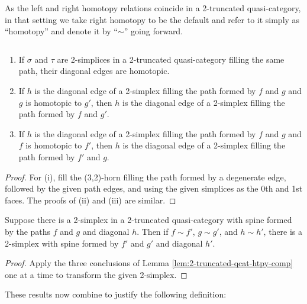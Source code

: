 As the left and right homotopy relations coincide in a 2-truncated quasi-category, in that setting we take right homotopy to be the default and refer to it simply as ``homotopy'' and denote it by ``$\sim$'' going forward.

\begin{lemma}\label{lem:2-truncated-qcat-htpy-comp}
   $\quad$
  \begin{enumerate}
    \item If $\sigma$ and $\tau$ are 2-simplices in a 2-truncated quasi-category filling the same path, their diagonal edges are homotopic.
    \item If $h$ is the diagonal edge of a 2-simplex filling the path formed by $f$ and $g$ and $g$ is homotopic to $g'$, then $h$ is the diagonal edge of a 2-simplex filling the path formed by $f$ and $g'$.
    \item If $h$ is the diagonal edge of a 2-simplex filling the path formed by $f$ and $g$ and $f$ is homotopic to $f'$, then $h$ is the diagonal edge of a 2-simplex filling the path formed by $f'$ and $g$.
  \end{enumerate}
\end{lemma}
\begin{proof}
  For (i), fill the (3,2)-horn filling the path formed by a degenerate edge, followed by the given path edges, and using the given simplices as the 0th and 1st faces. The proofs of (ii) and (iii) are similar.
\end{proof}

\begin{corollary}\label{cor:2-truncated-qcat-htpy-comp}
   Suppose there is a 2-simplex in a 2-truncated quasi-category with spine formed by the paths $f$ and $g$ and diagonal $h$. Then if $f \sim f'$, $g \sim g'$, and $h \sim h'$, there is a 2-simplex with spine formed by $f'$ and $g'$ and diagonal $h'$.
\end{corollary}
\begin{proof}
  Apply the three conclusions of Lemma \ref{lem:2-truncated-qcat-htpy-comp} one at a time to transform the given 2-simplex.
\end{proof}

These results now combine to justify the following definition:

